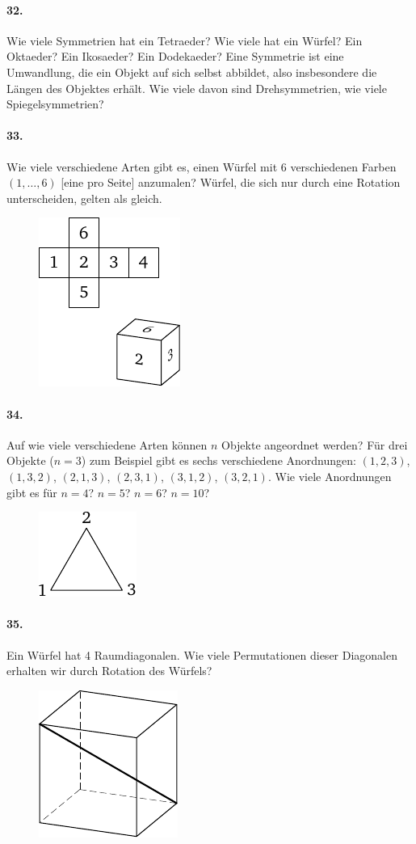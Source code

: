 \documentclass[10pt,a5paper,twoside]{article}
\newenvironment{problem}[1]{\paragraph*{#1}}{}
\begin{document}
\begin{problem}{32.}
	Wie viele Symmetrien hat ein Tetraeder? Wie viele hat ein Würfel? Ein Oktaeder? Ein Ikosaeder? Ein Dodekaeder? Eine Symmetrie ist eine Umwandlung, die ein Objekt auf sich selbst abbildet, also insbesondere die Längen des Objektes erhält. 
	Wie viele davon sind Drehsymmetrien, wie viele Spiegelsymmetrien?
\end{problem}

\begin{problem}{33.}
	Wie viele verschiedene Arten gibt es, einen Würfel mit 6 verschiedenen Farben $(1,\dotsc, 6)$ [eine pro Seite] anzumalen? Würfel, die sich nur durch eine Rotation unterscheiden, gelten als gleich.
	\begin{figure}[H]
	\centering
	\includegraphics{taskbook-17}
	\end{figure}
\end{problem}

\begin{problem}{34.}
	Auf wie viele verschiedene Arten können $n$ Objekte angeordnet werden? 
	Für drei Objekte ($n=3$) zum Beispiel gibt es sechs verschiedene Anordnungen: $(1,2,3)$, $(1,3,2)$, $(2,1,3)$, $(2,3,1)$, $(3,1,2)$, $(3,2,1)$. 
	Wie viele Anordnungen gibt es für $n=4$? $n=5$? $n=6$? $n=10$?
	\begin{figure}[H]
	\centering
	\includegraphics{taskbook-18}
	\end{figure}
\end{problem}

\begin{problem}{35.}
	Ein Würfel hat 4 Raumdiagonalen. Wie viele Permutationen dieser Diagonalen erhalten wir durch Rotation des Würfels?
	\begin{figure}[H]
	\centering
	\includegraphics{taskbook-19}
	\end{figure}
\end{problem}
\end{document}
